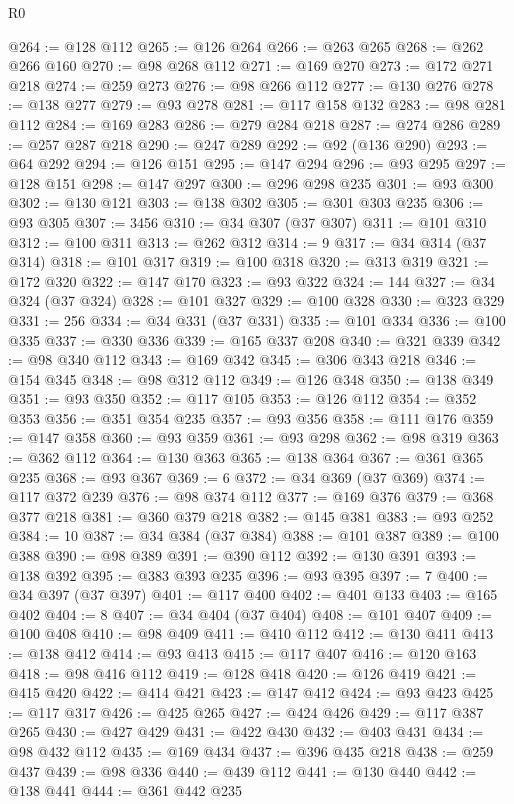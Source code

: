 \begin{lexlean}{R0}
\begin{coremodule}
@264 := @128 @112
@265 := @126 @264
@266 := @263 @265
@268 := @262 @266 @160
@270 := @98 @268 @112
@271 := @169 @270
@273 := @172 @271 @218
@274 := @259 @273
@276 := @98 @266 @112
@277 := @130 @276
@278 := @138 @277
@279 := @93 @278
@281 := @117 @158 @132
@283 := @98 @281 @112
@284 := @169 @283
@286 := @279 @284 @218
@287 := @274 @286
@289 := @257 @287 @218
@290 := @247 @289
@292 := @92 (@136 @290)
@293 := @64 @292
@294 := @126 @151
@295 := @147 @294
@296 := @93 @295
@297 := @128 @151
@298 := @147 @297
@300 := @296 @298 @235
@301 := @93 @300
@302 := @130 @121
@303 := @138 @302
@305 := @301 @303 @235
@306 := @93 @305
@307 := 3456
@310 := @34 @307 (@37 @307)
@311 := @101 @310
@312 := @100 @311
@313 := @262 @312
@314 := 9
@317 := @34 @314 (@37 @314)
@318 := @101 @317
@319 := @100 @318
@320 := @313 @319
@321 := @172 @320
@322 := @147 @170
@323 := @93 @322
@324 := 144
@327 := @34 @324 (@37 @324)
@328 := @101 @327
@329 := @100 @328
@330 := @323 @329
@331 := 256
@334 := @34 @331 (@37 @331)
@335 := @101 @334
@336 := @100 @335
@337 := @330 @336
@339 := @165 @337 @208
@340 := @321 @339
@342 := @98 @340 @112
@343 := @169 @342
@345 := @306 @343 @218
@346 := @154 @345
@348 := @98 @312 @112
@349 := @126 @348
@350 := @138 @349
@351 := @93 @350
@352 := @117 @105
@353 := @126 @112
@354 := @352 @353
@356 := @351 @354 @235
@357 := @93 @356
@358 := @111 @176
@359 := @147 @358
@360 := @93 @359
@361 := @93 @298
@362 := @98 @319
@363 := @362 @112
@364 := @130 @363
@365 := @138 @364
@367 := @361 @365 @235
@368 := @93 @367
@369 := 6
@372 := @34 @369 (@37 @369)
@374 := @117 @372 @239
@376 := @98 @374 @112
@377 := @169 @376
@379 := @368 @377 @218
@381 := @360 @379 @218
@382 := @145 @381
@383 := @93 @252
@384 := 10
@387 := @34 @384 (@37 @384)
@388 := @101 @387
@389 := @100 @388
@390 := @98 @389
@391 := @390 @112
@392 := @130 @391
@393 := @138 @392
@395 := @383 @393 @235
@396 := @93 @395
@397 := 7
@400 := @34 @397 (@37 @397)
@401 := @117 @400
@402 := @401 @133
@403 := @165 @402
@404 := 8
@407 := @34 @404 (@37 @404)
@408 := @101 @407
@409 := @100 @408
@410 := @98 @409
@411 := @410 @112
@412 := @130 @411
@413 := @138 @412
@414 := @93 @413
@415 := @117 @407
@416 := @120 @163
@418 := @98 @416 @112
@419 := @128 @418
@420 := @126 @419
@421 := @415 @420
@422 := @414 @421
@423 := @147 @412
@424 := @93 @423
@425 := @117 @317
@426 := @425 @265
@427 := @424 @426
@429 := @117 @387 @265
@430 := @427 @429
@431 := @422 @430
@432 := @403 @431
@434 := @98 @432 @112
@435 := @169 @434
@437 := @396 @435 @218
@438 := @259 @437
@439 := @98 @336
@440 := @439 @112
@441 := @130 @440
@442 := @138 @441
@444 := @361 @442 @235

\end{coremodule}
\end{lexlean}
